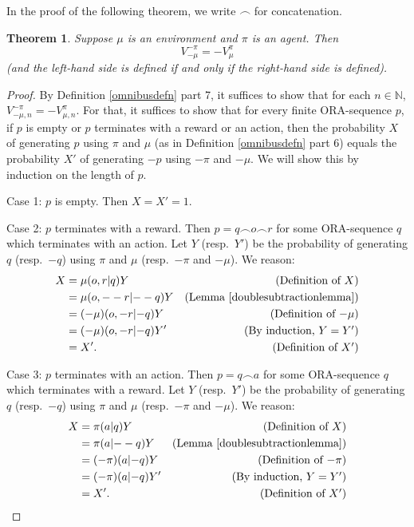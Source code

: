 \documentclass{article}
\newtheorem{theorem}{Theorem}
\begin{document}
In the proof of the following theorem, we write $\frown$ for concatenation.

\begin{theorem}
\label{bigtheorem}
    Suppose $\mu$ is an environment and $\pi$ is an agent.
    Then
    \[
        V^{-\pi}_{-\mu}=-V^\pi_\mu
    \]
    (and the left-hand side is defined if and only if the right-hand side is defined).
\end{theorem}

\begin{proof}
    By Definition \ref{omnibusdefn} part 7,
    it suffices to show that for each $n\in\mathbb N$,
    $V^{-\pi}_{-\mu,n}=-V^\pi_{\mu,n}$.
    For that, it suffices to show that for every finite ORA-sequence
    $p$, if $p$ is empty or $p$ terminates with a reward or an action, then
    the probability $X$ of generating $p$ using $\pi$ and $\mu$
    (as in Definition \ref{omnibusdefn} part 6)
    equals the probability $X'$ of generating $-p$
    using $-\pi$ and $-\mu$. We will show this by induction on the length of $p$.

    Case 1: $p$ is empty. Then $X=X'=1$.

    Case 2: $p$ terminates with a reward.
    Then $p=q\frown o \frown r$
    for some ORA-sequence $q$ which terminates with an action.
    Let $Y$ (resp.\ $Y'$) be the probability of generating $q$
    (resp.\ $-q$)
    using $\pi$ and $\mu$ (resp.\ $-\pi$ and $-\mu$). We reason:
    \begin{align*}
        X &= \mu(o,r|q)Y
            &\mbox{(Definition of $X$)}\\
          &= \mu(o,--r| {--q})Y
            &\mbox{(Lemma \ref{doublesubtractionlemma})}\\
          &= (-\mu)(o,-r| {-q})Y
            &\mbox{(Definition of $-\mu$)}\\
          &= (-\mu)(o,-r| {-q})Y'
            &\mbox{(By induction, $Y=Y'$)}\\
          &= X'. &\mbox{(Definition of $X'$)}
    \end{align*}

    Case 3: $p$ terminates with an action.
    Then $p=q\frown a$ for some ORA-sequence $q$ which terminates with a reward.
    Let $Y$ (resp.\ $Y'$) be the probability of generating $q$
    (resp.\ $-q$)
    using $\pi$ and $\mu$ (resp.\ $-\pi$ and $-\mu$). We reason:
    \begin{align*}
        X &= \pi(a|q)Y
            &\mbox{(Definition of $X$)}\\
          &= \pi(a|{--q})Y
            &\mbox{(Lemma \ref{doublesubtractionlemma})}\\
          &= (-\pi)(a|{-q})Y
            &\mbox{(Definition of $-\pi$)}\\
          &= (-\pi)(a|{-q})Y'
            &\mbox{(By induction, $Y=Y'$)}\\
          &= X'. &\mbox{(Definition of $X'$)}
    \end{align*}
\end{proof}
\end{document}
